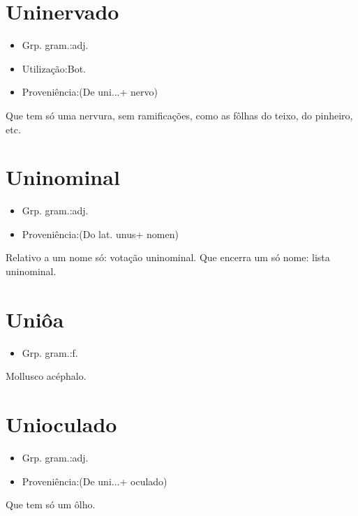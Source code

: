 \documentclass{article}
\begin{document}
\section{Uninervado}
\begin{itemize}
\item {Grp. gram.:adj.}
\end{itemize}
\begin{itemize}
\item {Utilização:Bot.}
\end{itemize}
\begin{itemize}
\item {Proveniência:(De \textunderscore uni...\textunderscore  + \textunderscore nervo\textunderscore )}
\end{itemize}
Que tem só uma nervura, sem ramificações, como as fôlhas do teixo, do pinheiro, etc.
\section{Uninominal}
\begin{itemize}
\item {Grp. gram.:adj.}
\end{itemize}
\begin{itemize}
\item {Proveniência:(Do lat. \textunderscore unus\textunderscore  + \textunderscore nomen\textunderscore )}
\end{itemize}
Relativo a um nome só: \textunderscore votação uninominal\textunderscore .
Que encerra um só nome: \textunderscore lista uninominal\textunderscore .
\section{Uniôa}
\begin{itemize}
\item {Grp. gram.:f.}
\end{itemize}
Mollusco acéphalo.
\section{Unioculado}
\begin{itemize}
\item {Grp. gram.:adj.}
\end{itemize}
\begin{itemize}
\item {Proveniência:(De \textunderscore uni...\textunderscore  + \textunderscore oculado\textunderscore )}
\end{itemize}
Que tem só um ôlho.
\end{document}
